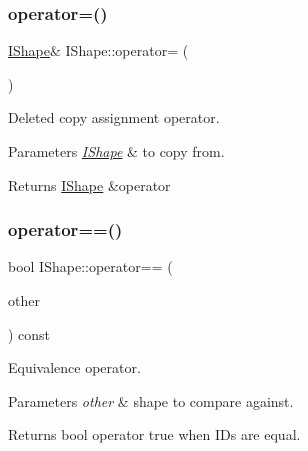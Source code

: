 \subsubsection{\texorpdfstring{operator=()}{operator=()}}
{\footnotesize\ttfamily \mbox{\hyperlink{class_i_shape}{I\+Shape}}\& I\+Shape\+::operator= (\begin{DoxyParamCaption}\item[{const \mbox{\hyperlink{class_i_shape}{I\+Shape}} \&}]{ }\end{DoxyParamCaption})\hspace{0.3cm}{\ttfamily [delete]}}



Deleted copy assignment operator. 


\begin{DoxyParams}{Parameters}
{\em \mbox{\hyperlink{class_i_shape}{I\+Shape}}} & to copy from. \\
\hline
\end{DoxyParams}
\begin{DoxyReturn}{Returns}
\mbox{\hyperlink{class_i_shape}{I\+Shape}} \&operator 
\end{DoxyReturn}
\mbox{\label{class_i_shape_a066b575cba3e0c3f8c6c80fba9ca2734}} 
\subsubsection{\texorpdfstring{operator==()}{operator==()}}
{\footnotesize\ttfamily bool I\+Shape\+::operator== (\begin{DoxyParamCaption}\item[{const \mbox{\hyperlink{class_i_shape}{I\+Shape}} \&}]{other }\end{DoxyParamCaption}) const}



Equivalence operator. 


\begin{DoxyParams}{Parameters}
{\em other} & shape to compare against. \\
\hline
\end{DoxyParams}
\begin{DoxyReturn}{Returns}
bool operator true when I\+Ds are equal. 
\end{DoxyReturn}
\mbox{\label{class_i_shape_a95d2cf58e5264e4e4bf1af65a383760c}} 
